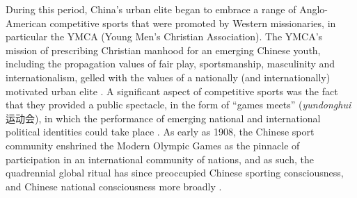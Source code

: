 
During this period, China's urban elite began to embrace a range of Anglo-American competitive sports that were promoted by Western missionaries, in particular the YMCA (Young Men's Christian Association).  The YMCA's mission of prescribing Christian manhood for an emerging Chinese youth, including the propagation values of fair play, sportsmanship, masculinity and internationalism, gelled with the values of a nationally (and internationally) motivated urban elite \citep[240]{Morris2004}.  A significant aspect of competitive sports was the fact that they provided a public spectacle, in the form of ``games meets'' (\textit{yundonghui} 运动会), in which the performance of emerging national and international political identities could take place \citep{Brownell2008}.
As early as 1908, the Chinese sport community enshrined the Modern Olympic Games as the pinnacle of participation in an international community of nations, and as such, the quadrennial global ritual has since preoccupied Chinese sporting consciousness, and Chinese national consciousness more broadly \cites{Jarvie2008}{Barme2009}[19]{Brownell2008}[3]{Morris2004}{Xu2010}.


